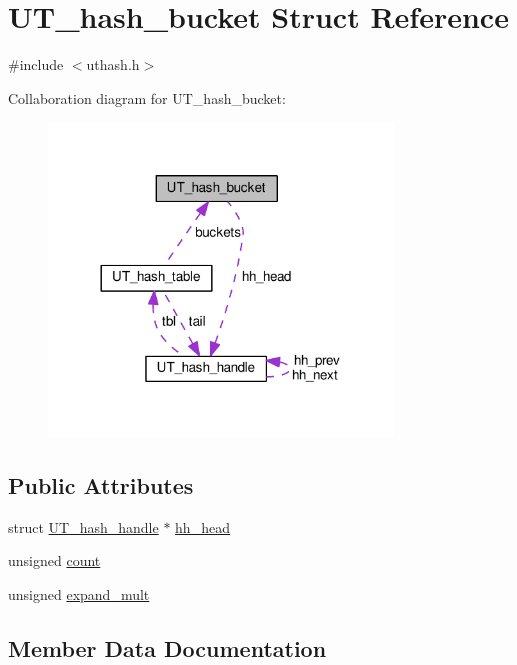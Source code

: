 \hypertarget{struct_u_t__hash__bucket}{}\section{U\+T\+\_\+hash\+\_\+bucket Struct Reference}
\label{struct_u_t__hash__bucket}


{\ttfamily \#include $<$uthash.\+h$>$}



Collaboration diagram for U\+T\+\_\+hash\+\_\+bucket\+:
\nopagebreak
\begin{figure}[H]
\begin{center}
\leavevmode
\includegraphics[width=260pt]{struct_u_t__hash__bucket__coll__graph}
\end{center}
\end{figure}
\subsection*{Public Attributes}
\begin{DoxyCompactItemize}
\item 
struct \hyperlink{struct_u_t__hash__handle}{U\+T\+\_\+hash\+\_\+handle} $\ast$ \hyperlink{struct_u_t__hash__bucket_a785a785132212378bb28fb4341cfecaf}{hh\+\_\+head}
\item 
unsigned \hyperlink{struct_u_t__hash__bucket_a5d20cc12bdcbde360398910eefb45634}{count}
\item 
unsigned \hyperlink{struct_u_t__hash__bucket_a9b739c1b69c141e8198c0c64af643b2b}{expand\+\_\+mult}
\end{DoxyCompactItemize}


\subsection{Member Data Documentation}
